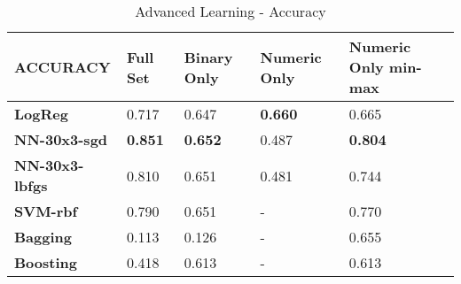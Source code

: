 \documentclass[10pt, conference, compsocconf]{IEEEtran}
\begin{document}
\begin{center}
	\begin{table}[t]
		\centering \footnotesize
		\vspace{0.01cm}
		\caption{Advanced Learning - Accuracy}
		\hspace{1cm}
		\begin{tabularx}{\linewidth}{ l  X  X  X  X }
			\hline
			\textbf{ACCURACY} &	\textbf{Full Set}&	\textbf{Binary Only}&	\textbf{Numeric Only}&	\textbf{Numeric Only min-max} \\ \hline
			
			
			\textbf{LogReg}&	0.717&	0.647&	\textbf{0.660}&	0.665\\ \hline
			\textbf{NN-30x3-sgd}&	\textbf{0.851}&	\textbf{0.652}&	0.487&	\textbf{0.804}\\ \hline
			\textbf{NN-30x3-lbfgs}&	0.810&	0.651&	0.481&	0.744\\ \hline
			\textbf{SVM-rbf}&	0.790&	0.651&	-&	0.770\\ \hline
			\textbf{Bagging}&	0.113&	0.126&	-&	0.655\\ \hline
			\textbf{Boosting}&	0.418&	0.613&	-&	0.613 \\ \hline
			
			
		\end{tabularx}\newline
		\vspace{-0.05cm}
		\label{Table5}
	\end{table} \hfil
\end{center}
\end{document}
